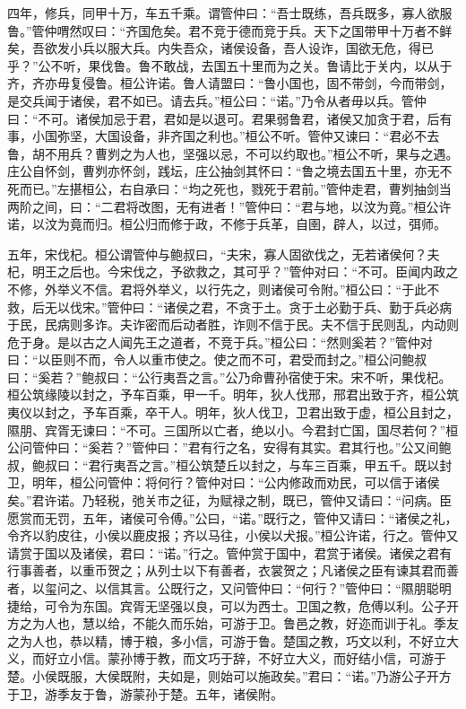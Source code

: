 \documentclass[]{article}
\begin{document}
四年，修兵，同甲十万，车五千乘。谓管仲曰：``吾士既练，吾兵既多，寡人欲服鲁。''管仲喟然叹曰：``齐国危矣。君不竞于德而竞于兵。天下之国带甲十万者不鲜矣，吾欲发小兵以服大兵。内失吾众，诸侯设备，吾人设诈，国欲无危，得已乎？''公不听，果伐鲁。鲁不敢战，去国五十里而为之关。鲁请比于关内，以从于齐，齐亦毋复侵鲁。桓公许诺。鲁人请盟曰：``鲁小国也，固不带剑，今而带剑，是交兵闻于诸侯，君不如已。请去兵。''桓公曰：``诺。''乃令从者毋以兵。管仲曰：``不可。诸侯加忌于君，君如是以退可。君果弱鲁君，诸侯又加贪于君，后有事，小国弥坚，大国设备，非齐国之利也。''桓公不听。管仲又谏曰：``君必不去鲁，胡不用兵？曹刿之为人也，坚强以忌，不可以约取也。''桓公不听，果与之遇。庄公自怀剑，曹刿亦怀剑，践坛，庄公抽剑其怀曰：``鲁之境去国五十里，亦无不死而已。''左揕桓公，右自承曰：``均之死也，戮死于君前。''管仲走君，曹刿抽剑当两阶之间，曰：``二君将改图，无有进者！''管仲曰：``君与地，以汶为竟。''桓公许诺，以汶为竟而归。桓公归而修于政，不修于兵革，自圉，辟人，以过，弭师。

五年，宋伐杞。桓公谓管仲与鲍叔曰，``夫宋，寡人固欲伐之，无若诸侯何？夫杞，明王之后也。今宋伐之，予欲救之，其可乎？''管仲对曰：``不可。臣闻内政之不修，外举义不信。君将外举义，以行先之，则诸侯可令附。''桓公曰：``于此不救，后无以伐宋。''管仲曰：``诸侯之君，不贪于土。贪于土必勤于兵、勤于兵必病于民，民病则多诈。夫诈密而后动者胜，诈则不信于民。夫不信于民则乱，内动则危于身。是以古之人闻先王之道者，不竞于兵。''桓公曰：``然则奚若？''管仲对曰：``以臣则不而，令人以重市使之。使之而不可，君受而封之。''桓公问鲍叔曰：``奚若？''鲍叔曰：``公行夷吾之言。''公乃命曹孙宿使于宋。宋不听，果伐杞。桓公筑缘陵以封之，予车百乘，甲一千。明年，狄人伐邢，邢君出致于齐，桓公筑夷仪以封之，予车百乘，卒干人。明年，狄人伐卫，卫君出致于虚，桓公且封之，隰朋、宾胥无谏曰：``不可。三国所以亡者，绝以小。今君封亡国，国尽若何？''桓公问管仲曰：``奚若？''管仲曰：''君有行之名，安得有其实。君其行也。''公又间鲍叔，鲍叔曰：``君行夷吾之言。''桓公筑楚丘以封之，与车三百乘，甲五千。既以封卫，明年，桓公问管仲：将何行？管仲对曰：``公内修政而劝民，可以信于诸侯矣。''君许诺。乃轻税，弛关市之征，为赋禄之制，既已，管仲又请曰：``问病。臣愿赏而无罚，五年，诸侯可令傅。''公曰，``诺。''既行之，管仲又请曰：``诸侯之礼，令齐以豹皮往，小侯以鹿皮报；齐以马往，小侯以犬报。''桓公许诺，行之。管仲又请赏于国以及诸侯，君曰：``诺。''行之。管仲赏于国中，君赏于诸侯。诸侯之君有行事善者，以重币贺之；从列士以下有善者，衣裳贺之；凡诸侯之臣有谏其君而善者，以玺问之、以信其言。公既行之，又问管仲曰：``何行？''管仲曰：``隰朋聪明捷给，可令为东国。宾胥无坚强以良，可以为西士。卫国之教，危傅以利。公子开方之为人也，慧以给，不能久而乐始，可游于卫。鲁邑之教，好迩而训于礼。季友之为人也，恭以精，博于粮，多小信，可游于鲁。楚国之教，巧文以利，不好立大义，而好立小信。蒙孙博于教，而文巧于辞，不好立大义，而好结小信，可游于楚。小侯既服，大侯既附，夫如是，则始可以施政矣。''君曰：``诺。''乃游公子开方于卫，游季友于鲁，游蒙孙于楚。五年，诸侯附。
\end{document}
